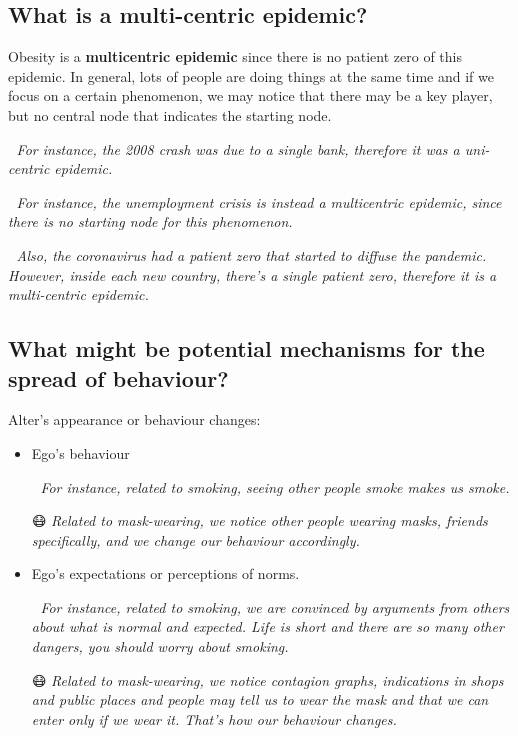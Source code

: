 \documentclass[
  notitlepage,
  onecolumn,
  openany]{book}
\begin{document}
\hypertarget{what-is-a-multi-centric-epidemic}{%
\subsection{What is a multi-centric epidemic?}\label{what-is-a-multi-centric-epidemic}}

Obesity is a \textbf{multicentric epidemic} since there is no patient zero of this epidemic. In general, lots of people are doing things at the same time and if we focus on a certain phenomenon, we may notice that there may be a key player, but no central node that indicates the starting node.

🏦 \emph{For instance, the 2008 crash was due to a single bank, therefore it was a uni-centric epidemic.}

💼 \emph{For instance, the unemployment crisis is instead a multicentric epidemic, since there is no starting node for this phenomenon.}

🦠 \emph{Also, the coronavirus had a patient zero that started to diffuse the pandemic. However, inside each new country, there's a single patient zero, therefore it is a multi-centric epidemic.}

\hypertarget{what-might-be-potential-mechanisms-for-the-spread-of-behaviour}{%
\subsection{What might be potential mechanisms for the spread of behaviour?}\label{what-might-be-potential-mechanisms-for-the-spread-of-behaviour}}

Alter's appearance or behaviour changes:

\begin{itemize}
\item
  Ego's behaviour

  🚬 \emph{For instance, related to smoking, seeing other people smoke makes us smoke.}

  😷 \emph{Related to mask-wearing, we notice other people wearing masks, friends specifically, and we change our behaviour accordingly.}
\item
  Ego's expectations or perceptions of norms.

  🚬 \emph{For instance, related to smoking, we are convinced by arguments from others about what is normal and expected. Life is short and there are so many other dangers, you should worry about smoking.}

  😷 \emph{Related to mask-wearing, we notice contagion graphs, indications in shops and public places and people may tell us to wear the mask and that we can enter only if we wear it. That's how our behaviour changes.}
\end{itemize}
\end{document}
